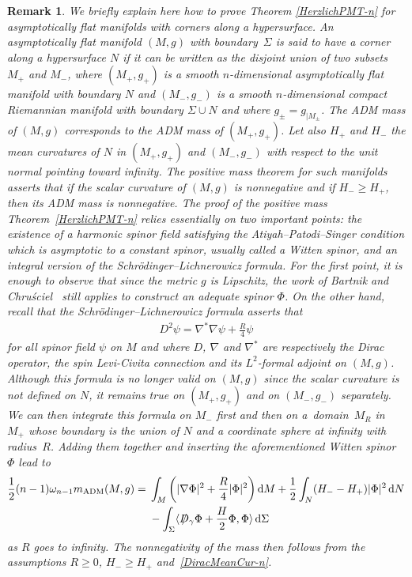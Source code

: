 \documentclass[10pt,a4paper]{amsart}
\numberwithin{equation}{section}
\newtheorem{Remark}[Theorem]{Remark}
\def\D{D\!\!\!\!/\,}
\begin{document}
\begin{Remark}\label{SpinBoundaryCorner}
We briefly explain here how to prove Theorem \ref{HerzlichPMT-n} for asymptotically flat manifolds with corners along a hypersurface. An asymptotically flat manifold $(M,g)$ with boundary~$\Sigma$ is said to have a corner along a hypersurface $N$ if it can be written as the disjoint union of two subsets $M_+$ and $M_-$, where $(M_+,g_{+})$ is a smooth $n$-dimensional asymptotically flat manifold with boundary $N$ and $(M_-,g_-)$ is a smooth $n$-dimensional compact Riemannian manifold with boundary $\Sigma\cup N$ and where $g_\pm=g_{|M_\pm}$. The ADM mass of $(M,g)$ corresponds to the ADM mass of $(M_+,g_+)$. Let also $H_+$ and $H_-$ the mean curvatures of $N$ in $(M_+,g_+)$ and $(M_-,g_-)$ with respect to the unit normal pointing toward infinity. The positive mass theorem for such manifolds asserts that if the scalar curvature of $(M,g)$ is nonnegative and if $H_-\geq H_+$, then its ADM mass is nonnegative. The proof of the positive mass Theorem~\ref{HerzlichPMT-n} relies essentially on two important points: the existence of a harmonic spinor field satisfying the Atiyah--Patodi--Singer condition which is asymptotic to a constant spinor, usually called a Witten spinor, and an integral version of the Schr\"odinger--Lichnerowicz formula. For the first point, it is enough to observe that since the metric $g$ is Lipschitz, the work of Bartnik and Chru\'sciel~\cite{BartnikChrusciel} still applies to construct an adequate spinor $\Phi$. On the other hand, recall that the Schr\"odinger--Lichnerowicz formula asserts that
\begin{gather*}%
D^2\psi=\nabla^*\nabla\psi+\frac{R}{4}\psi
\end{gather*}
for all spinor field $\psi$ on $M$ and where $D$, $\nabla$ and $\nabla^\ast$ are respectively the Dirac operator, the spin Levi-Civita connection and its $L^2$-formal adjoint on $(M,g)$. Although this formula is no longer valid on $(M,g)$ since the scalar curvature is not defined on $N$, it remains true on $(M_+,g_+)$ and on $(M_-,g_-)$ separately. We can then integrate this formula on $M_-$ first and then on a~domain~$M_R$ in~$M_+$ whose boundary is the union of $N$ and a coordinate sphere at infinity with radius~$R$. Adding them together and inserting the aforementioned Witten spinor $\Phi$ lead to
\begin{align*}
\frac{1}{2}(n-1)\omega_{n-1}m_{\rm ADM}(M,g) ={} & \int_{M}\bigg(|\nabla\Phi|^2+\frac{R}{4}|\Phi|^2\bigg)\,{\rm d}M+\frac{1}{2}\int_N(H_--H_+)|\Phi|^2\,{\rm d}N
\\
& -\int_{\Sigma}\langle \D_\gamma\Phi+\frac{H}{2}\Phi,\Phi\rangle \,{\rm d}\Sigma
\end{align*}
as $R$ goes to infinity. The nonnegativity of the mass then follows from the assumptions $R\geq 0$, $H_-\geq H_+$ and~\eqref{DiracMeanCur-n}.
\end{Remark}
\end{document}
